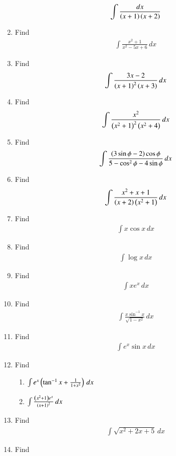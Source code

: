 \begin{enumerate}[label=\arabic*.,ref=\thesubsection.\theenumi]
\begin{align}
\int \frac{dx}{\left(x+1\right)\left(x+2\right)}
\end{align}
\item Find 
\begin{align}
\int \frac{x^2+1}{x^2-5x+6}\,dx
\end{align}
%
\item Find 
\begin{align}
\int \frac{3x-2}{\left(x+1\right)^2\left(x+3\right)}\,dx
\end{align}
%
\item Find 
\begin{align}
\int \frac{x^2}{\left(x^2+1\right)^2\left(x^2+4\right)}\,dx
\end{align}
%
\item Find 
\begin{align}
\int \frac{\left(3\sin \phi -2\right)\cos \phi}{5-\cos^2\phi - 4\sin \phi}\,dx
\end{align}
%
\item Find 
\begin{align}
\int \frac{x^2+x+1}{\left(x+2\right)\left(x^2+1\right)}\,dx
\end{align}
%
\item Find 
\begin{align}
\int x\cos x\,dx
\end{align}
%
\item Find 
\begin{align}
\int \log x\,dx
\end{align}
%
\item Find 
\begin{align}
\int xe^x\,dx
\end{align}
%
\item Find 
\begin{align}
\int \frac{x\sin^{-1}x}{\sqrt{1-x^2}}\,dx
\end{align}
%
\item Find 
\begin{align}
\int e^x \sin x\,dx
\end{align}
%
%
\item Find 
\begin{enumerate}
%
\item  $\int e^x\left(\tan^{-1}x+\frac{1}{1+x^2}\right)\,dx$
\item  $\int \frac{\left(x^2+1\right)e^x}{\left(x+1\right)^2}\,dx$
%
\end{enumerate}
%
%
\item Find 
\begin{align}
\int \sqrt{x^2+2x+5}\,dx
\end{align}
%
\item Find 

\end{enumerate}
